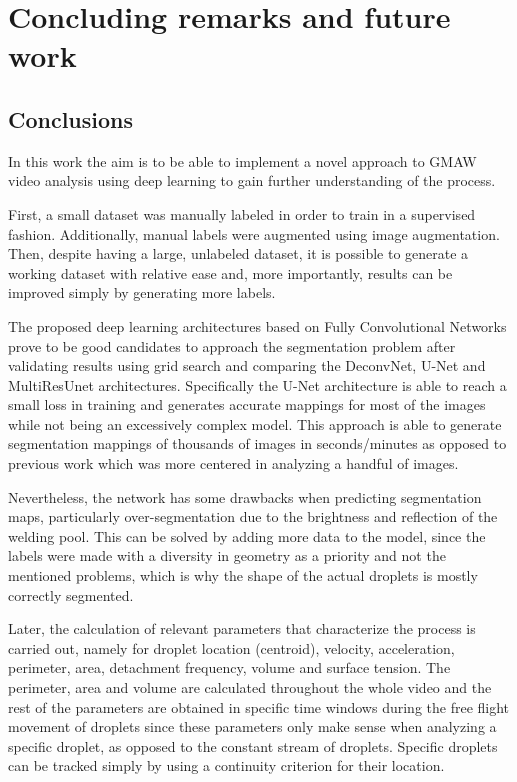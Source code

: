 \chapter{Concluding remarks and future work}\label{chap:conclusions}
\section{Conclusions}
In this work the aim is to be able to implement a novel approach to GMAW video analysis using deep learning to gain further understanding of the process.

First, a small dataset was manually labeled in order to train in a supervised fashion. Additionally, manual labels were augmented using image augmentation. Then, despite having a large, unlabeled dataset, it is possible to generate a working dataset with relative ease and, more importantly, results can be improved simply by generating more labels.

The proposed deep learning architectures based on Fully Convolutional Networks prove to be good candidates to approach the segmentation problem after validating results using grid search and comparing the DeconvNet, U-Net and MultiResUnet architectures. Specifically the U-Net architecture is able to reach a small loss in training and generates accurate mappings for most of the images while not being an excessively complex model. This approach is able to generate segmentation mappings of thousands of images in seconds/minutes as opposed to previous work which was more centered in analyzing a handful of images.

Nevertheless, the network has some drawbacks when predicting segmentation maps, particularly over-segmentation due to the brightness and reflection of the welding pool. This can be solved by adding more data to the model, since the labels were made  with a diversity in geometry as a priority and not the mentioned problems, which is why the shape of the actual droplets is mostly correctly segmented.

Later, the calculation of relevant parameters that characterize the process is carried out, namely for droplet location (centroid), velocity, acceleration, perimeter, area, detachment frequency, volume and surface tension. The perimeter, area and volume are calculated throughout the whole video and the rest of the parameters are obtained in specific time windows during the free flight movement of droplets since these parameters only make sense when analyzing a specific droplet, as opposed to the constant stream of droplets. Specific droplets can be tracked simply by using a continuity criterion for their location.

